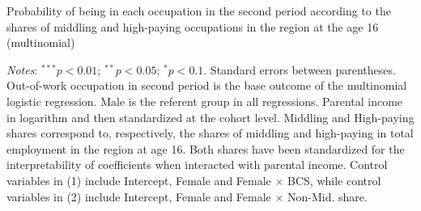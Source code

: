 \begin{landscape}
\begin{table}[!tb]
    \centering
    \caption{Probability of being in each occupation in the second period according to the shares of middling and high-paying occupations in the region at the age 16 (multinomial)}
    \label{chap2-tab:regocc-multi2B-short}
    \begin{threeparttable}
        \setlength{\tabcolsep}{-1pt}
        
        \begin{tablenotes}[flushleft]
            \footnotesize{\item\textit{Notes}: 
            $^{***}p<0.01$; $^{**}p<0.05$; $^{*}p<0.1$. Standard errors between parentheses. 
            Out-of-work occupation in second period is the base outcome of the multinomial logistic regression.
            Male is the referent group in all regressions.
            Parental income in logarithm and then standardized at the cohort level. Middling and High-paying shares correspond to, respectively, the shares of middling and high-paying in total employment in the region at age 16. Both shares have been standardized for the interpretability of coefficients when interacted with parental income.
            Control variables in (1) include Intercept, Female and Female $\times$ BCS, while control variables in (2) include Intercept, Female and Female $\times$ Non-Mid. share. %
            }
        \end{tablenotes}
    \end{threeparttable}
\end{table}
\end{landscape}

